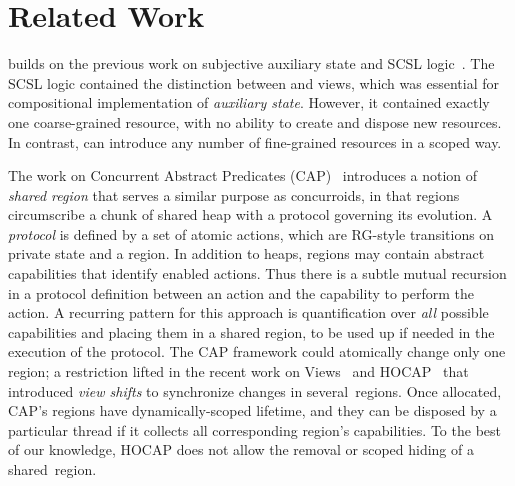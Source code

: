 \section{Related Work}\label{sec:related}

\SCST builds on the previous work on subjective auxiliary state and
SCSL logic~\cite{LeyWild-Nanevski:POPL13}. The SCSL logic contained
the distinction between \self and \other views, which was essential
for compositional implementation of \emph{auxiliary state}. However,
it contained exactly one coarse-grained resource, with no ability to
create and dispose new resources. In contrast, \SCST can introduce any
number of fine-grained resources in a scoped way.

The work on Concurrent Abstract Predicates
(CAP)~\cite{DinsdaleYoung-al:ECOOP10} introduces a notion of
\emph{shared region} that serves a similar purpose as concurroids, in
that regions circumscribe a chunk of shared heap with a protocol
governing its evolution. A \emph{protocol} is defined by a set of
atomic actions, which are RG-style transitions on private state and a
region. In addition to heaps, regions may contain abstract
capabilities that identify enabled actions. Thus there is a subtle
mutual recursion in a protocol definition between an action and the
capability to perform the action. A recurring pattern for this
approach is quantification over \emph{all} possible capabilities and
placing them in a shared region, to be used up if needed in the
execution of the protocol. The CAP framework could atomically change
only one region; a restriction lifted in the recent work on
Views~\cite{DinsdaleYoung-al:POPL13} and
HOCAP~\cite{Svendsen-al:ESOP13} that introduced \emph{view shifts} to
synchronize changes in several~regions.
%
Once allocated, CAP's regions have dynamically-scoped lifetime, and
they can be disposed by a particular thread if it collects all
corresponding region's capabilities. To the best of our knowledge,
HOCAP does not allow the removal or scoped hiding of a shared~region.
%

